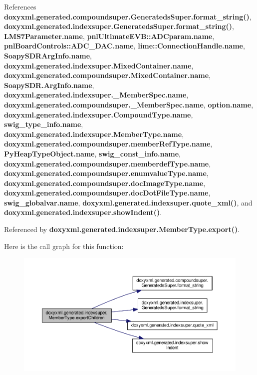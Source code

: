 References {\bf doxyxml.\+generated.\+compoundsuper.\+Generateds\+Super.\+format\+\_\+string()}, {\bf doxyxml.\+generated.\+indexsuper.\+Generateds\+Super.\+format\+\_\+string()}, {\bf L\+M\+S7\+Parameter.\+name}, {\bf pnl\+Ultimate\+E\+V\+B\+::\+A\+D\+Cparam.\+name}, {\bf pnl\+Board\+Controls\+::\+A\+D\+C\+\_\+\+D\+A\+C.\+name}, {\bf lime\+::\+Connection\+Handle.\+name}, {\bf Soapy\+S\+D\+R\+Arg\+Info.\+name}, {\bf doxyxml.\+generated.\+indexsuper.\+Mixed\+Container.\+name}, {\bf doxyxml.\+generated.\+compoundsuper.\+Mixed\+Container.\+name}, {\bf Soapy\+S\+D\+R.\+Arg\+Info.\+name}, {\bf doxyxml.\+generated.\+indexsuper.\+\_\+\+Member\+Spec.\+name}, {\bf doxyxml.\+generated.\+compoundsuper.\+\_\+\+Member\+Spec.\+name}, {\bf option.\+name}, {\bf doxyxml.\+generated.\+indexsuper.\+Compound\+Type.\+name}, {\bf swig\+\_\+type\+\_\+info.\+name}, {\bf doxyxml.\+generated.\+indexsuper.\+Member\+Type.\+name}, {\bf doxyxml.\+generated.\+compoundsuper.\+member\+Ref\+Type.\+name}, {\bf Py\+Heap\+Type\+Object.\+name}, {\bf swig\+\_\+const\+\_\+info.\+name}, {\bf doxyxml.\+generated.\+compoundsuper.\+memberdef\+Type.\+name}, {\bf doxyxml.\+generated.\+compoundsuper.\+enumvalue\+Type.\+name}, {\bf doxyxml.\+generated.\+compoundsuper.\+doc\+Image\+Type.\+name}, {\bf doxyxml.\+generated.\+compoundsuper.\+doc\+Dot\+File\+Type.\+name}, {\bf swig\+\_\+globalvar.\+name}, {\bf doxyxml.\+generated.\+indexsuper.\+quote\+\_\+xml()}, and {\bf doxyxml.\+generated.\+indexsuper.\+show\+Indent()}.



Referenced by {\bf doxyxml.\+generated.\+indexsuper.\+Member\+Type.\+export()}.



Here is the call graph for this function\+:
\nopagebreak
\begin{figure}[H]
\begin{center}
\leavevmode
\includegraphics[width=350pt]{d0/da4/classdoxyxml_1_1generated_1_1indexsuper_1_1MemberType_acacd7b34d6578127452c705a35161421_cgraph}
\end{center}
\end{figure}




